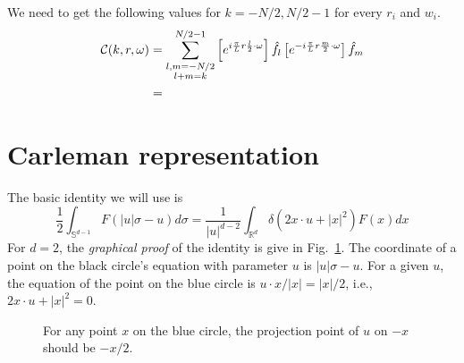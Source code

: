 \documentclass[11pt]{amsart}
\begin{document}
\color{black}
We need to get the following values for $k = -N/2, N/2-1$ for every $r_i$ and $w_i$. 
\begin{align}
\begin{split}
\mathcal{C}(k, r, \omega)  &= \sum_{\substack{l,m=-N/2\\l+m=k}}^{N/2-1} \left[ e^{i{\pi \over L} r {l\over 2}\cdot \omega } \right] \hat{f}_l  \left[ e^{-i{\pi \over L} r {m\over 2}\cdot \omega } \right] \hat{f}_m \\
&= 
\end{split}
\end{align}
 


\section{Carleman representation}

The basic identity we will use is 
\begin{equation}
\frac{1}{2} \int_{\mathbb{S}^{d-1}} F(|u| \sigma-u) d \sigma=\frac{1}{|u|^{d-2}} \int_{\mathbb{R}^{d}} \delta\left(2 x \cdot u+|x|^{2}\right) F(x) d x
\end{equation}
For $d=2$, the \emph{graphical proof} of the identity is give in Fig.~\ref{fig:identity}. The coordinate of a point on the black circle's equation with parameter $u$ is $|u| \sigma-u$.  For a given $u$, the equation of the point on the blue circle is $ u\cdot x/|x| = |x|/2$, i.e., $2 x \cdot u+|x|^{2}= 0$. 

\begin{figure}[htbp]
\begin{center}
\caption{For any point $x$ on the blue circle, the projection point of $u$ on $-x$ should be $-x/2$.}
\label{fig:identity}
\end{center}
\end{figure}
\end{document}
